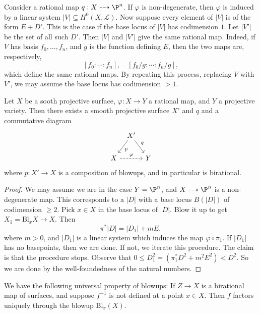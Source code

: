 \documentclass[a4paper]{article}
\newcommand\Bl{\mathrm{Bl}}
\begin{document}
Consider a rational map $q: X \dashrightarrow \P^n$. If $\varphi$ is non-degenerate, then $\varphi$ is induced by a linear system $|V| \subseteq H^0(X, \mathcal{L})$. Now suppose every element of $|V|$ is of the form $E + D'$. This is the case if the base locus of $|V|$ has codimension $1$. Let $|V'|$ be the set of all such $D'$. Then $|V|$ and $|V'|$ give the same rational map. Indeed, if $V$ has basis $f_0, \ldots, f_n$, and $g$ is the function defining $E$, then the two maps are, respectively,
\[
  [f_0: \cdots : f_n],\quad [f_0/g : \cdots : f_n/g],
\]
which define the same rational maps. By repeating this process, replacing $V$ with $V'$, we may assume the base locus has codimension $>1$.

\begin{thm}
  Let $X$ be a sooth projective surface, $\varphi: X \to Y$ a rational map, and $Y$ a projective variety. Then there exists a smooth projective surface $X'$ and $q$ and a commutative diagram
  \[
    \begin{tikzcd}[column sep=tiny]
      & X' \ar[ld, "p"] \ar[rd, "q"]\\
      X \ar[rr,dashed, "\varphi"] && Y
    \end{tikzcd}
  \]
  where $p: X' \to X$ is a composition of blowups, and in particular is birational.
\end{thm}

\begin{proof}
  We may assume we are in the case $Y = \P^n$, and $X \dashrightarrow \P^n$ is a non-degenerate map. This corresponds to a $|D|$ with a base locus $B(|D|)$ of codimension $\geq 2$. Pick $x \in X$ in the base locus of $|D|$. Blow it up to get $X_1 = \Bl_x X \to X$. Then
  \[
    \pi^* |D| = |D_1| + mE,
  \]
  where $m > 0$, and $|D_1|$ is a linear system which induces the map $\varphi \circ \pi_1$. If $|D_1|$ has no basepoints, then we are done. If not, we iterate this procedure. The claim is that the procedure stops. Observe that $0 \leq D_1^2 = (\pi_1^* D^2 + m^2 E^2) < D^2$. So we are done by the well-foundedness of the natural numbers.
\end{proof}

\begin{prop}
  We have the following universal property of blowups: If $Z \to X$ is a birational map of surfaces, and suppose $f^{-1}$ is not defined at a point $x \in X$. Then $f$ factors uniquely through the blowup $\Bl_x(X)$.\fakeqed
\end{prop}
\end{document}
